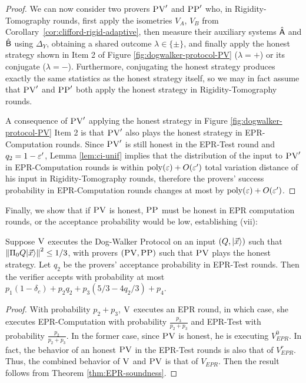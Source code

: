 \begin{proof}
We can now consider two provers $\textsc{PV}'$ and $\textsc{PP}'$ who, in Rigidity-Tomography rounds, first apply the isometries $V_A$, $V_B$ from Corollary~\ref{cor:clifford-rigid-adaptive}, then  measure their auxiliary systems $\hat{{\textsf{A}}}$ and $\hat{{\textsf{B}}}$ using $\Delta_Y$, obtaining a shared outcome $\lambda\in\{\pm\}$, and finally apply the honest strategy shown in Item 2 of Figure \ref{fig:dogwalker-protocol-PV} ($\lambda=+$) or its conjugate ($\lambda = -$). Furthermore, conjugating the honest strategy produces exactly the same statistics as the honest strategy itself, so we may in fact assume that $\textsc{PV}'$ and $\textsc{PP}'$ both apply the honest strategy in Rigidity-Tomography rounds. 


A consequence of $\textsc{PV}'$ applying the honest strategy in Figure \ref{fig:dogwalker-protocol-PV} Item 2 is that $\textsc{PV}'$ also plays the honest strategy in EPR-Computation rounds. Since $\textsc{PV}'$ is still honest in the EPR-Test round and $q_2 = 1-\varepsilon'$, Lemma \ref{lem:ci-unif} implies that the distribution of the input to $\textsc{PV}'$ in EPR-Computation rounds is within $\operatorname{poly}(\varepsilon)+O(\varepsilon')$ total variation distance of his input in
Rigidity-Tomography rounds, therefore the provers' success probability in EPR-Computation rounds changes at most by $\mathrm{poly}(\varepsilon)+O(\varepsilon')$. 
\end{proof}


Finally, we show that if $\textsc{PV}$ is honest, $\textsc{PP}$ must be honest in EPR computation rounds, or the acceptance probability would be low, establishing (vii):
\begin{lemma}\label{lem:PP-3}
Suppose $\textsc{V}$ %
 executes the Dog-Walker Protocol on an input $(Q,|\vec{x}\rangle)$ such that $\left\|\Pi_0 Q|\vec{x}\rangle\right\|^2\leq 1/3$, with provers $(\textsc{PV},\textsc{PP})$ such that $\textsc{PV}$ plays the honest strategy. Let $q_2$ be the provers' acceptance probability in EPR-Test rounds. Then the verifier accepts with probability at most
  $p_1(1-\delta_c) +p_2q_2+p_3(5/3-4q_2/3)+p_4$. 
\end{lemma}
\begin{proof}
With probability $p_2+p_3$, $\textsc{V}$ executes an EPR round, in which case, she executes EPR-Computation with probability $\frac{p_3}{p_2+p_3}$ and EPR-Test with probability $\frac{p_2}{p_2+p_3}$. In the former case, since $\textsc{PV}$ is honest, he is executing $V_{EPR}^0$. In fact, the behavior of an honest $\textsc{PV}$ in the EPR-Test rounds is also that of $V_{EPR}^r$. Thus, the combined behavior of $\textsc{V}$ and $\textsc{PV}$ is that of $V_{EPR}$. Then the result follows from Theorem \ref{thm:EPR-soundness}. 
\end{proof}

